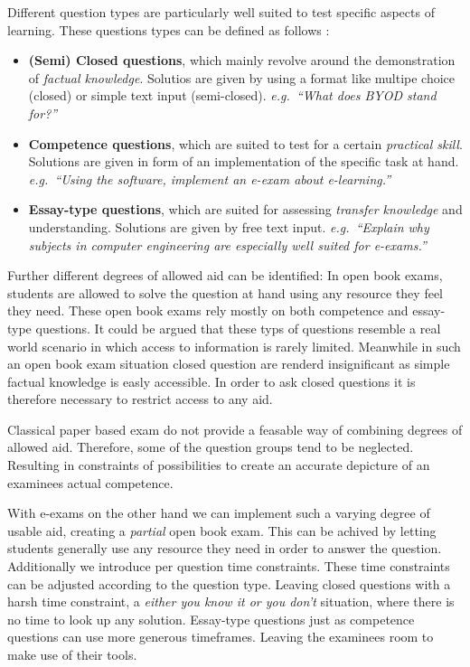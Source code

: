 Different question types are particularly well suited to test specific
aspects of learning. These questions types can be defined as follows :

\begin{itemize}
\item
  \textbf{(Semi) Closed questions}, which mainly revolve around the
  demonstration of \emph{factual knowledge}. Solutios are given by using
  a format like multipe choice (closed) or simple text input
  (semi-closed). \emph{e.g.~``What does \emph{BYOD} stand for?''}
\item
  \textbf{Competence questions}, which are suited to test for a certain
  \emph{practical skill}. Solutions are given in form of an
  implementation of the specific task at hand. \emph{e.g.~``Using the
  software, implement an e-exam about e-learning.''}
\item
  \textbf{Essay-type questions}, which are suited for assessing
  \emph{transfer knowledge} and understanding. Solutions are given by
  free text input. \emph{e.g.~``Explain why subjects in computer
  engineering are especially well suited for e-exams.''}
\end{itemize}

Further different degrees of allowed aid can be identified: In open book
exams, students are allowed to solve the question at hand using any
resource they feel they need. These open book exams rely mostly on both
competence and essay-type questions. It could be argued that these typs
of questions resemble a real world scenario in which access to
information is rarely limited. Meanwhile in such an open book exam
situation closed question are renderd insignificant as simple factual
knowledge is easly accessible. In order to ask closed questions it is
therefore necessary to restrict access to any aid.

Classical paper based exam do not provide a feasable way of combining
degrees of allowed aid. Therefore, some of the question groups tend to
be neglected. Resulting in constraints of possibilities to create an
accurate depicture of an examinees actual competence.

With e-exams on the other hand we can implement such a varying degree of
usable aid, creating a \emph{partial} open book exam. This can be
achived by letting students generally use any resource they need in
order to answer the question. Additionally we introduce per question
time constraints. These time constraints can be adjusted according to
the question type. Leaving closed questions with a harsh time
constraint, a \emph{either you know it or you don't} situation, where
there is no time to look up any solution. Essay-type questions just as
competence questions can use more generous timeframes. Leaving the
examinees room to make use of their tools.

